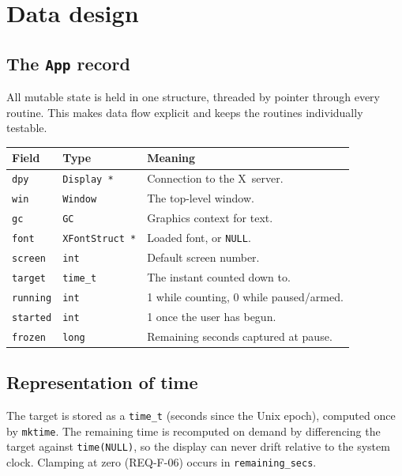 \documentclass[12pt]{article}
\newcommand{\code}[1]{\texttt{#1}}
\begin{document}
\section{Data design}

\subsection{The \code{App} record}

All mutable state is held in one structure, threaded by pointer through
every routine.  This makes data flow explicit and keeps the routines
individually testable.

\begin{longtable}{p{}p{}p{}}
\toprule
\textbf{Field} & \textbf{Type} & \textbf{Meaning} \\
\midrule
\code{dpy} & \code{Display *} & Connection to the X~server. \\
\code{win} & \code{Window} & The top-level window. \\
\code{gc} & \code{GC} & Graphics context for text. \\
\code{font} & \code{XFontStruct *} & Loaded font, or \code{NULL}. \\
\code{screen} & \code{int} & Default screen number. \\
\code{target} & \code{time\_t} & The instant counted down to. \\
\code{running} & \code{int} & 1 while counting, 0 while paused/armed. \\
\code{started} & \code{int} & 1 once the user has begun. \\
\code{frozen} & \code{long} & Remaining seconds captured at pause. \\
\bottomrule
\end{longtable}

\subsection{Representation of time}

The target is stored as a \code{time\_t} (seconds since the Unix epoch),
computed once by \code{mktime}.  The remaining time is recomputed on demand
by differencing the target against \code{time(NULL)}, so the display can
never drift relative to the system clock.  Clamping at zero (REQ-F-06)
occurs in \code{remaining\_secs}.
\end{document}
